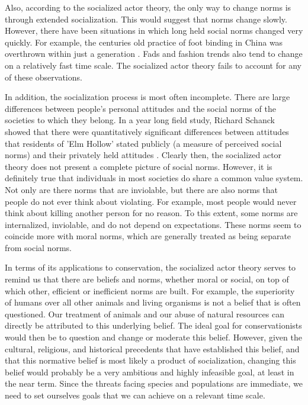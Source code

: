 \documentclass[rutwik_proposal.tex]{subfiles}
\begin{document}
Also, according to the socialized actor theory, the only way to change norms is through extended socialization. This would suggest that norms change slowly. However, there have been situations in which long held social norms changed very quickly. For example, the centuries old practice of foot binding in China was overthrown within just a generation \cite{Mackie96}. Fads and fashion trends also tend to change on a relatively fast time scale. The socialized actor theory fails to account for any of these observations.

In addition, the socialization process is most often incomplete. There are large differences between people's personal attitudes and the social norms of the societies to which they belong. In a year long field study, Richard Schanck showed that there were quantitatively significant differences between attitudes that residents of 'Elm Hollow' stated publicly (a measure of perceived social norms) and their privately held attitudes \cite{Schanck32}. Clearly then, the socialized actor theory does not present a complete picture of social norms. However, it is definitely true that individuals in most societies do share a common value system. Not only are there norms that are inviolable, but there are also norms that people do not ever think about violating. For example, most people would never think about killing another person for no reason. To this extent, some norms are internalized, inviolable, and do not depend on expectations. These norms seem to coincide more with moral norms, which are generally treated as being separate from social norms.

In terms of its applications to conservation, the socialized actor theory serves to remind us that there are beliefs and norms, whether moral or social, on top of which other, efficient or inefficient norms are built. For example, the superiority of humans over all other animals and living organisms is not a belief that is often questioned. Our treatment of animals and our abuse of natural resources can directly be attributed to this underlying belief. The ideal goal for conservationists would then be to question and change or moderate this belief. However, given the cultural, religious, and historical precedents that have established this belief, and that this normative belief is most likely a product of socialization, changing this belief would probably be a very ambitious and highly infeasible goal, at least in the near term. Since the threats facing species and populations are immediate, we need to set ourselves goals that we can achieve on a relevant time scale.
\end{document}
